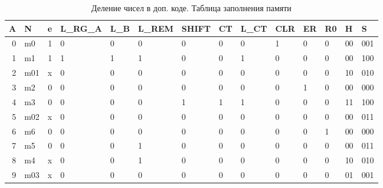 \documentclass[a4paper,14pt]{extarticle}
\begin{document}
\newpage
\begin{landscape}
\begin{table}[h!]
	\centering
	\begin{tabular}{|r||l|r|l|l|l|l|l|l|l|l|l|l|l|}
		\hline
		\multicolumn{1}{|l||}{\textbf{A}} & \textbf{N} & \multicolumn{1}{l|}{\textbf{e}} & \textbf{L\_RG\_A} & \textbf{L\_B} & \textbf{L\_REM} & \textbf{SHIFT} & \textbf{CT} & \textbf{L\_CT} & \textbf{CLR} & \textbf{ER} & \textbf{R0} & \textbf{H} & \textbf{S} \\ \hline \hline
		0 & m0 & 1 & 0 & 0 & 0 & 0 & 0 & 0 & 1 & 0 & 0 & 00 & 001 \\ \hline
		1 & m1 & 1 & 1 & 1 & 1 & 0 & 0 & 1 & 0 & 0 & 0 & 00 & 100 \\ \hline
		2 & m01 & \multicolumn{1}{l|}{x} & 0 & 0 & 0 & 0 & 0 & 0 & 0 & 0 & 0 & 10 & 010 \\ \hline
		3 & m2 & 0 & 0 & 0 & 0 & 0 & 0 & 0 & 0 & 1 & 0 & 00 & 000 \\ \hline
		4 & m3 & 0 & 0 & 0 & 0 & 1 & 1 & 1 & 0 & 0 & 0 & 11 & 100 \\ \hline
		5 & m02 & \multicolumn{1}{l|}{x} & 0 & 0 & 0 & 0 & 0 & 0 & 0 & 0 & 0 & 00 & 011 \\ \hline
		6 & m6 & 0 & 0 & 0 & 0 & 0 & 0 & 0 & 0 & 0 & 1 & 00 & 000 \\ \hline
		7 & m5 & 0 & 0 & 0 & 1 & 0 & 0 & 0 & 0 & 0 & 0 & 00 & 011 \\ \hline
		8 & m4 & \multicolumn{1}{l|}{x} & 0 & 0 & 1 & 0 & 0 & 0 & 0 & 0 & 0 & 10 & 010 \\ \hline
		9 & m03 & \multicolumn{1}{l|}{x} & 0 & 0 & 0 & 0 & 0 & 0 & 0 & 0 & 0 & 01 & 001 \\ \hline
	\end{tabular}
\caption{Деление чисел в доп. коде. Таблица заполнения памяти}
\label{tab:coursedivmemory}
\end{table}
\end{landscape}
\end{document}
